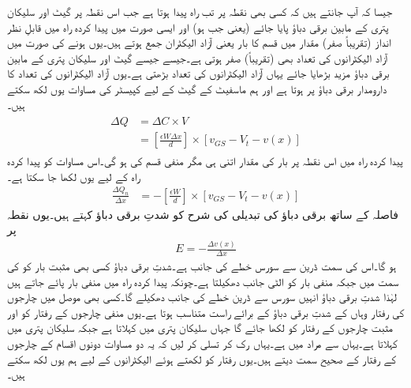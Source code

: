 جیسا کہ آپ جانتے ہیں کہ کسی بھی نقطہ   پر تب راہ پیدا ہوتا ہے جب اس نقطہ پر گیٹ اور سلیکان پتری کے مابین  برقی دباؤ پایا جائے (یعنی جب   ہو) اور ایسی صورت میں پیدا کردہ راہ میں قابلِ نظر انداز (تقریباً صفر) مقدار میں  قسم کا بار یعنی آزاد الیکٹران جمع ہوتے ہیں۔یوں  ہونے کی صورت میں آزاد الیکٹرانوں کی تعداد بھی (تقریباً) صفر ہوتی ہے۔جیسے جیسے گیٹ اور سلیکان پتری کے مابین برقی دباؤ مزید بڑھایا جائے یہاں آزاد الیکٹرانوں کی تعداد بڑھتی ہے۔یوں آزاد الیکٹرانوں کی تعداد کا دارومدار برقی دباؤ  پر ہوتا ہے اور ہم ماسفیٹ کے گیٹ کے لیے کپیسٹر کی مساوات یوں لکھ سکتے ہیں۔
\begin{gather}
\begin{aligned}
\Delta Q&=\Delta C \times V\\
&=\left[\frac{\epsilon W \Delta x}{d} \right ] \times \left[v_{GS}-V_t-v(x) \right ]
\end{aligned}
\end{gather}
پیدا کردہ راہ میں اس نقطہ پر بار کی مقدار اتنی ہی مگر منفی قسم کی ہو گی۔اس مساوات کو پیدا کردہ راہ کے لیے یوں لکھا جا سکتا ہے۔
\begin{align} \label{مساوات_میدانی_راہ_میں_چارج_بالمقابل_فاصلہ}
\frac{\Delta Q_n}{\Delta x}&=-\left[\frac{\epsilon W}{d} \right ] \times \left [v_{GS}-V_t-v(x) \right ]
\end{align}
فاصلہ کے ساتھ برقی دباؤ کی  تبدیلی کی شرح  کو شدتِ برقی دباؤ   کہتے ہیں۔یوں نقطہ   پر
\begin{align}
E=-\frac{\Delta v(x)}{\Delta x}
\end{align}
ہو گا۔اس کی سمت ڈرین سے سورس خطے کی جانب ہے۔شدتِ برقی دباؤ کسی بھی مثبت بار کو  کی سمت میں جبکہ منفی بار کو الٹی جانب دھکیلتا ہے۔چونکہ پیدا کردہ راہ میں منفی بار پائے جاتے ہیں لہٰذا شدتِ برقی دباؤ انہیں سورس سے ڈرین خطے کی جانب دھکیلے گا۔کسی بھی موصل میں چارجوں کی رفتار وہاں کے شدتِ برقی دباؤ کے برائے راست متناسب ہوتا ہے۔یوں منفی چارجوں کے رفتار کو  اور مثبت چارجوں کے رفتار کو   لکھا جائے گا جہاں   سلیکان پتری میں   کہلاتا ہے جبکہ   سلیکان پتری میں   کہلاتا ہے۔یہاں  سے مراد  میں  ہے۔یہاں رک کر تسلی کر لیں کہ یہ دو مساوات دونوں اقسام کے چارجوں کے رفتار کے صحیح سمت دیتے ہیں۔یوں رفتار کو  لکھتے ہوئے الیکٹرانوں کے لیے ہم یوں لکھ سکتے ہیں۔
